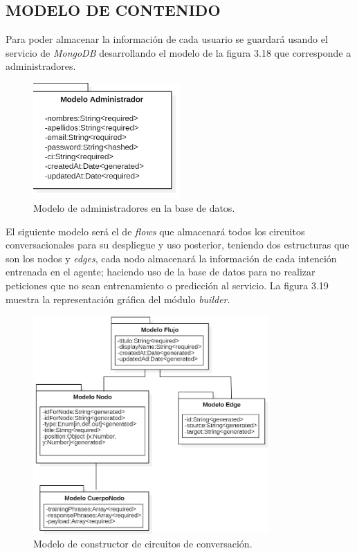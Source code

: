 \documentclass[letter, openright, 12pt]{book}
\begin{document}
\subsection{MODELO DE CONTENIDO}
Para poder almacenar la información de cada usuario se guardará usando el servicio de {\it MongoDB} desarrollando el modelo de la figura 3.18 que corresponde a administradores. 

\begin{figure}[H]
\centering
\includegraphics[width=0.5\textwidth]{figura3_18}
 \caption{Modelo de administradores en la base de datos. }
\label{fig:figura3_18}
\end{figure}

El siguiente modelo será el de {\it flows } que almacenará todos los circuitos conversacionales para su despliegue y uso posterior, teniendo dos estructuras que son los nodos y {\it edges}, cada nodo almacenará la información de cada intención entrenada en el agente; haciendo uso de la base de datos para no realizar peticiones que no sean entrenamiento o predicción al servicio. La figura 3.19 muestra la representación gráfica del módulo {\it builder}. 

\begin{figure}[H]
\centering
\includegraphics[width=0.8\textwidth]{figura3_19}
 \caption{Modelo de constructor de circuitos de conversación. }
\label{fig:figura3_19}
\end{figure}
\end{document}
